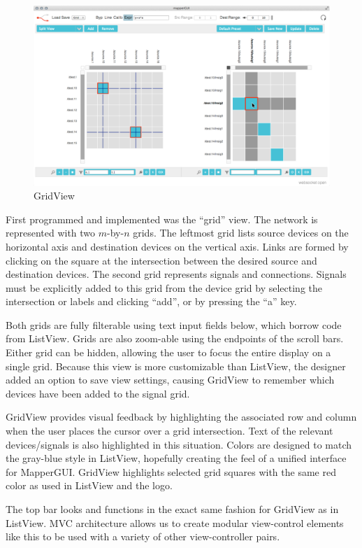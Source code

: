 \begin{figure}[ht]
\centering
	\includegraphics[width=\textwidth]{figures/grid_w_cursor}
\caption{GridView}
\label{fig:grid}
\end{figure}

First programmed and implemented was the ``grid'' view. The network is represented with two $m$-by-$n$ grids. The leftmost grid lists source devices on the horizontal axis and destination devices on the vertical axis. Links are formed by clicking on the square at the intersection between the desired source and destination devices. The second grid represents signals and connections. Signals must be explicitly added to this grid from the device grid by selecting the intersection or labels and clicking ``add'', or by pressing the ``a'' key. 

Both grids are fully filterable using text input fields below, which borrow code from ListView. Grids are also zoom-able using the endpoints of the scroll bars. Either grid can be hidden, allowing the user to focus the entire display on a single grid. Because this view is more customizable than ListView, the designer added an option to save view settings, causing GridView to remember which devices have been added to the signal grid.

GridView provides visual feedback by highlighting the associated row and column when the user places the cursor over a grid intersection. Text of the relevant devices/signals is also highlighted in this situation. Colors are designed to match the gray-blue style in ListView, hopefully creating the feel of a unified interface for MapperGUI. GridView highlights selected grid squares with the same red color as used in ListView and the logo.

The top bar looks and functions in the exact same fashion for GridView as in ListView. MVC architecture allows us to create modular view-control elements like this to be used with a variety of other view-controller pairs.

